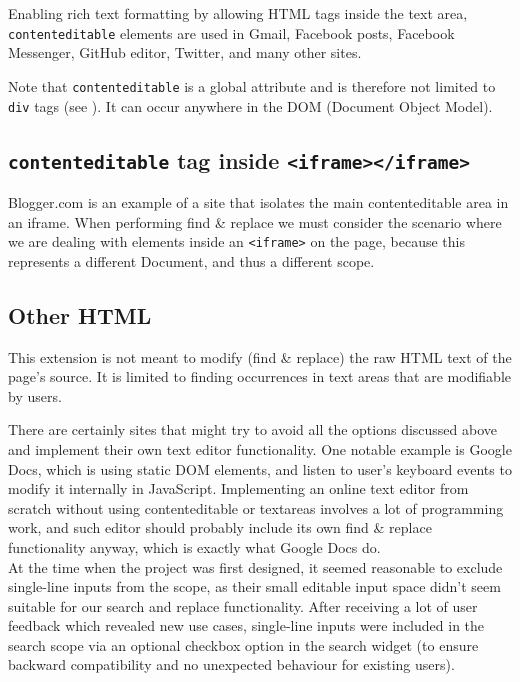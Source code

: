 \documentclass[bsc,frontabs,twoside,singlespacing,parskip,deptreport]{infthesis}
\begin{document}
Enabling rich text formatting by allowing HTML tags inside the text
area, \texttt{contenteditable} elements are used in Gmail, Facebook
posts, Facebook Messenger, GitHub editor, Twitter, and many other sites.

Note that \texttt{contenteditable} is a global attribute and is
therefore not limited to \texttt{div} tags (see \cite{M4}). It can occur anywhere in the DOM (Document Object Model).

\subsection{\texttt{contenteditable} tag inside 
\texttt{\textless{}iframe\textgreater{}\textless{}/iframe\textgreater{}}}

Blogger.com is an example of a site that isolates the main
contenteditable area in an iframe. When performing find \& replace we
must consider the scenario where we are dealing with elements inside an \texttt{\textless{}iframe\textgreater{}} on the page, because this represents a different Document, and thus a different scope.

\subsection{Other HTML}
This extension is not meant to modify (find \& replace) the raw HTML text of the page's source. It is limited to finding occurrences in text areas that are modifiable by users.  

There are certainly sites that might try to avoid all the options discussed above and implement their own text editor functionality. One notable example is Google Docs, which is using static DOM elements, and listen to user's keyboard events to modify it internally in JavaScript. Implementing an online text editor from scratch without using contenteditable or textareas involves a lot of programming work, and such editor should probably include its own find \& replace functionality anyway, which is exactly what Google Docs do. \\

At the time when the project was first designed, it seemed reasonable to exclude single-line inputs from the scope, as their small editable input space didn't seem suitable for our search and replace functionality. After receiving a lot of user feedback which revealed new use cases, single-line inputs were included in the search scope via an optional checkbox option in the search widget (to ensure backward compatibility and no unexpected behaviour for existing users).
\end{document}
